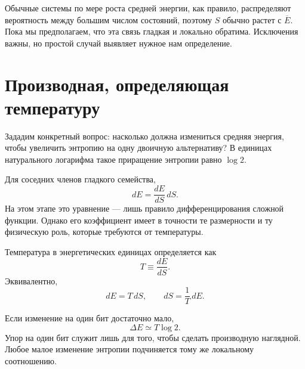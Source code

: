 Обычные системы по мере роста средней энергии, как правило, распределяют вероятность между большим числом состояний, поэтому \(S\) обычно растет с \(\overline E\). Пока мы предполагаем, что эта связь гладкая и локально обратима. Исключения важны, но простой случай выявляет нужное нам определение.

\section{Производная, определяющая температуру}

Зададим конкретный вопрос: насколько должна измениться средняя энергия, чтобы увеличить энтропию на одну двоичную альтернативу? В единицах натурального логарифма такое приращение энтропии равно \(\log2\).

Для соседних членов гладкого семейства,
\begin{equation}
 dE=\frac{dE}{dS}\,dS.
 \label{eq:sm2-differential-identity}
\end{equation}
На этом этапе это уравнение — лишь правило дифференцирования сложной функции. Однако его коэффициент имеет в точности те размерности и ту физическую роль, которые требуются от температуры.

\begin{definition}
Температура в энергетических единицах определяется как
\begin{equation}
 T\equiv\frac{dE}{dS}.
 \label{eq:sm2-temperature-definition}
\end{equation}
Эквивалентно,
\begin{equation}
 dE=T\,dS,
 \qquad
 dS=\frac{1}{T}\,dE.
 \label{eq:sm2-fundamental-differentials}
\end{equation}
\end{definition}

Если изменение на один бит достаточно мало,
\begin{equation}
 \Delta E\simeq T\log2.
 \label{eq:sm2-one-bit-energy}
\end{equation}
Упор на один бит служит лишь для того, чтобы сделать производную наглядной. Любое малое изменение энтропии подчиняется тому же локальному соотношению.

\begin{classroomqa}
\end{classroomqa}

